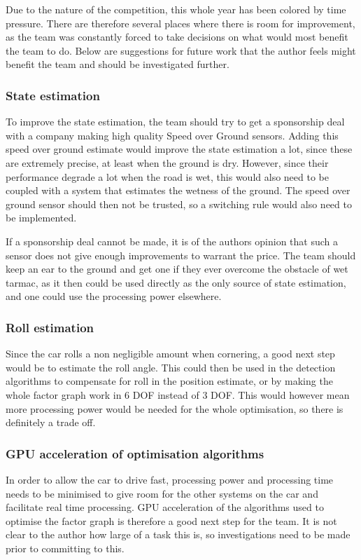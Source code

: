 Due to the nature of the competition, this whole year has been colored by time pressure. There are therefore several places where there is room for improvement, as the team was constantly forced to take decisions on what would most benefit the team to do. Below are suggestions for future work that the author feels might benefit the team and should be investigated further.

\subsubsection{State estimation}
To improve the state estimation, the team should try to get a sponsorship deal with a company making high quality Speed over Ground sensors. Adding this speed over ground estimate would improve the state estimation a lot, since these are extremely precise, at least when the ground is dry. However, since their performance degrade a lot when the road is wet, this would also need to be coupled with a system that estimates the wetness of the ground. The speed over ground sensor should then not be trusted, so a switching rule would also need to be implemented. 

If a sponsorship deal cannot be made, it is of the authors opinion that such a sensor does not give enough improvements to warrant the price. The team should keep an ear to the ground and get one if they ever overcome the obstacle of wet tarmac, as it then could be used directly as the only source of state estimation, and one could use the processing power elsewhere.

\subsubsection{Roll estimation}
Since the car rolls a non negligible amount when cornering, a good next step would be to estimate the roll angle. This could then be used in the detection algorithms to compensate for roll in the position estimate, or by making the whole factor graph work in 6 \gls{DOF} instead of 3 \gls{DOF}. This would however mean more processing power would be needed for the whole optimisation, so there is definitely a trade off.

\subsubsection{GPU acceleration of optimisation algorithms}
In order to allow the car to drive fast, processing power and processing time needs to be minimised to give room for the other systems on the car and facilitate real time processing. GPU acceleration of the algorithms used to optimise the factor graph is therefore a good next step for the team. It is not clear to the author how large of a task this is, so investigations need to be made prior to committing to this.

